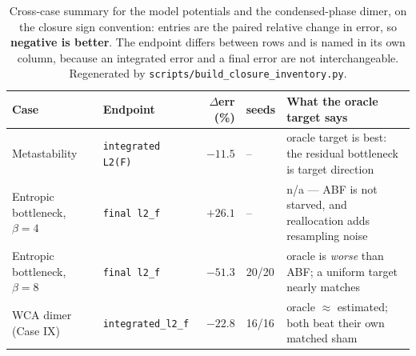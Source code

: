 \begin{table}[t]
\centering
\small
\caption{Cross-case summary for the model potentials and the condensed-phase dimer, on the closure sign convention: entries are the paired relative change in error, so \textbf{negative is better}. The endpoint differs between rows and is named in its own column, because an integrated error and a final error are not interchangeable. Regenerated by \texttt{scripts/build\_closure\_inventory.py}.}
\label{tab:synthesis}
\begin{tabular}{llrl>{\raggedright\arraybackslash}p{5.2cm}}
\toprule
Case & Endpoint & $\Delta$err (\%) & seeds & What the oracle target says \\
\midrule
Metastability & \texttt{integrated L2(F)} & $-11.5$ & -- & oracle target is best: the residual bottleneck is target direction \\
Entropic bottleneck, $\beta{=}4$ & \texttt{final l2\_f} & $+26.1$ & -- & n/a --- ABF is not starved, and reallocation adds resampling noise \\
Entropic bottleneck, $\beta{=}8$ & \texttt{final l2\_f} & $-51.3$ & 20/20 & oracle is \emph{worse} than ABF; a uniform target nearly matches \\
WCA dimer (Case IX) & \texttt{integrated\_l2\_f} & $-22.8$ & 16/16 & oracle $\approx$ estimated; both beat their own matched sham \\
\bottomrule
\end{tabular}
\end{table}
